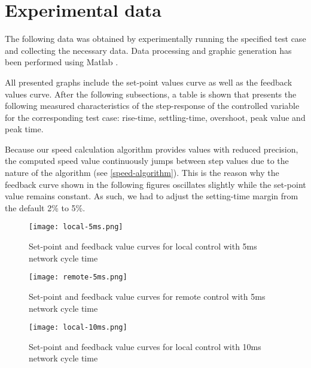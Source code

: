 \section{Experimental data}
The following data was obtained by experimentally running the specified test case and collecting the necessary data.
Data processing and graphic generation has been performed using Matlab \cite{sw:matlab}.

All presented graphs include the set-point values curve as well as the feedback values curve.
After the following subsections, a table is shown that presents the following measured characteristics of the step-response of the controlled variable for the corresponding test case: rise-time, settling-time, overshoot, peak value and peak time.

Because our speed calculation algorithm provides values with reduced precision, the computed speed value continuously jumps between step values due to the nature of the algorithm (see \autoref{speed-algorithm}).
This is the reason why the feedback curve shown in the following figures oscillates slightly while the set-point value remains constant.
As such, we had to adjust the setting-time margin from the default 2\% to 5\%.

\begin{figure}[H]
	\centering
	\texttt{[image: local-5ms.png]}
	\caption{Set-point and feedback value curves for local control with 5ms network cycle time}
	\label{fig:local-5ms}
\end{figure}

\begin{figure}[H]
	\centering
	\texttt{[image: remote-5ms.png]}
	\caption{Set-point and feedback value curves for remote control with 5ms network cycle time}
	\label{fig:remote-5ms}
\end{figure}

\clearpage
\begin{figure}[H]
	\centering
	\texttt{[image: local-10ms.png]}
	\caption{Set-point and feedback value curves for local control with 10ms network cycle time}
	\label{fig:local-10ms}
\end{figure}

